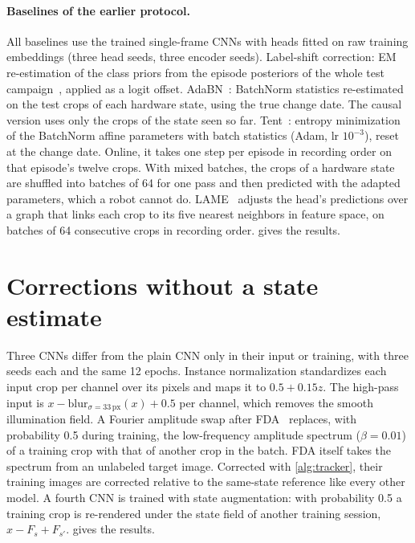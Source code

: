\documentclass[10pt,twocolumn,letterpaper]{article}
\begin{document}
\paragraph{Baselines of the earlier protocol.} All baselines use the trained single-frame CNNs with heads fitted on raw training embeddings (three head seeds, three encoder seeds). Label-shift correction: EM re-estimation of the class priors from the episode posteriors of the whole test campaign~\cite{saerens2002labelshift}, applied as a logit offset. AdaBN~\cite{li2018adabn}: BatchNorm statistics re-estimated on the test crops of each hardware state, using the true change date. The causal version uses only the crops of the state seen so far. Tent~\cite{wang2021tent}: entropy minimization of the BatchNorm affine parameters with batch statistics (Adam, lr $10^{-3}$), reset at the change date. Online, it takes one step per episode in recording order on that episode's twelve crops. With mixed batches, the crops of a hardware state are shuffled into batches of 64 for one pass and then predicted with the adapted parameters, which a robot cannot do. LAME~\cite{boudiaf2022lame} adjusts the head's predictions over a graph that links each crop to its five nearest neighbors in feature space, on batches of 64 consecutive crops in recording order.  gives the results.


\section{Corrections without a state estimate}
Three CNNs differ from the plain CNN only in their input or training, with three seeds each and the same 12 epochs. Instance normalization standardizes each input crop per channel over its pixels and maps it to $0.5+0.15z$. The high-pass input is $x-\mathrm{blur}_{\sigma=33\,\mathrm{px}}(x)+0.5$ per channel, which removes the smooth illumination field. A Fourier amplitude swap after FDA~\cite{fda2020} replaces, with probability 0.5 during training, the low-frequency amplitude spectrum ($\beta=0.01$) of a training crop with that of another crop in the batch. FDA itself takes the spectrum from an unlabeled target image. Corrected with \cref{alg:tracker}, their training images are corrected relative to the same-state reference like every other model. A fourth CNN is trained with state augmentation: with probability 0.5 a training crop is re-rendered under the state field of another training session, $x - F_s + F_{s'}$.  gives the results.
\end{document}
